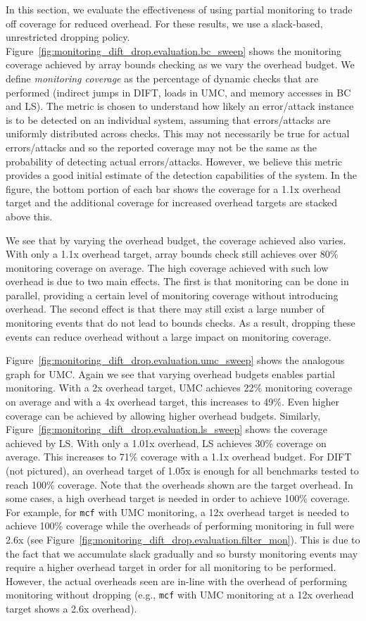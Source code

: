 In this section, we evaluate the effectiveness of using partial monitoring to
trade off coverage for reduced overhead.  For these results, we use a
slack-based, unrestricted dropping policy.
Figure~\ref{fig:monitoring_dift_drop.evaluation.bc_sweep} shows the monitoring
coverage achieved by array bounds checking as we vary the overhead budget.  We
define \emph{monitoring coverage} as the percentage of dynamic checks that are
performed (indirect jumps in DIFT, loads in UMC, and memory accesses in BC and
LS).  The metric is chosen to understand how likely an error/attack instance is
to be detected on an individual system, assuming that errors/attacks are
uniformly distributed across checks. This may not necessarily be true for
actual errors/attacks and so the reported coverage may not be the same as the
probability of detecting actual errors/attacks.  However, we believe this
metric provides a good initial estimate of the detection capabilities of the
system.  In the figure, the bottom portion of each bar shows the coverage for a
1.1x overhead target and the additional coverage for increased overhead targets
are stacked above this.

We see that by varying the overhead budget, the coverage achieved also varies.
With only a 1.1x overhead target, array bounds check still achieves over 80\%
monitoring coverage on average. The high coverage achieved with such low
overhead is due to two main effects.  The first is that monitoring can be done
in parallel, providing a certain level of monitoring coverage without
introducing overhead. The second effect is that there may still exist a large
number of monitoring events that do not lead to bounds checks. As a result,
dropping these events can reduce overhead without a large impact on monitoring
coverage.

Figure~\ref{fig:monitoring_dift_drop.evaluation.umc_sweep} shows the analogous
graph for UMC. Again we see that varying overhead budgets enables partial
monitoring.  With a 2x overhead target, UMC achieves 22\% monitoring coverage
on average and with a 4x overhead target, this increases to 49\%.  Even higher
coverage can be achieved by allowing higher overhead budgets.  Similarly,
Figure~\ref{fig:monitoring_dift_drop.evaluation.ls_sweep} shows the coverage
achieved by LS.  With only a 1.01x overhead, LS achieves 30\% coverage on
average. This increases to 71\% coverage with a 1.1x overhead budget.  For DIFT
(not pictured), an overhead target of 1.05x is enough for all benchmarks tested
to reach 100\% coverage.  Note that the overheads shown are the target
overhead. In some cases, a high overhead target is needed in order to achieve
100\% coverage. For example, for {\tt mcf} with UMC monitoring, a 12x overhead
target is needed to achieve 100\% coverage while the overheads of performing
monitoring in full were 2.6x (see
Figure~\ref{fig:monitoring_dift_drop.evaluation.filter_mon}). This is due to
the fact that we accumulate slack gradually and so bursty monitoring events may
require a higher overhead target in order for all monitoring to be performed.
However, the actual overheads seen are in-line with the overhead of performing
monitoring without dropping (e.g., {\tt mcf} with UMC monitoring at a 12x
overhead target shows a 2.6x overhead).

